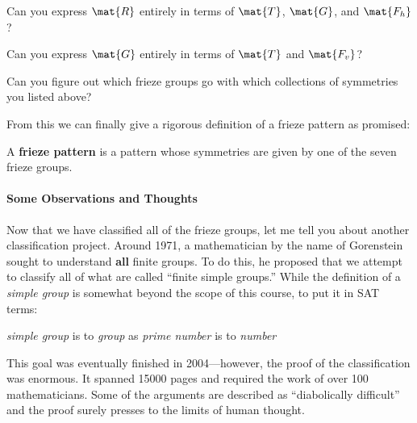 \begin{ques} 
Can you express $\mat{R}$ entirely in terms of $\mat{T}$, $\mat{G}$,
and $\mat{F_h}$?
\end{ques}
\QM

\begin{ques} 
Can you express $\mat{G}$ entirely in terms of $\mat{T}$ and $\mat{F_v}$?
\end{ques}
\QM


\begin{ques} 
Can you figure out which frieze groups go with which collections of
symmetries you listed above?
\end{ques}
\QM


From this we can finally give a rigorous definition of a frieze pattern
as promised:

\begin{dfn}
A \textbf{frieze pattern} is a pattern whose symmetries are given by
one of the seven frieze groups.
\end{dfn}




\paragraph{Some Observations and Thoughts}


Now that we have classified all of the frieze groups, let me tell you about
another classification project. Around 1971, a mathematician by the
name of Gorenstein sought to understand \textbf{all} finite
groups. To do this, he proposed that we attempt to classify all of
what are called ``finite simple groups.'' While the definition of a
\textit{simple group} is somewhat beyond the scope of this course, to
put it in SAT terms:
\begin{center}
\textit{simple group} is to \textit{group} \qquad as \qquad \textit{prime number} is to \textit{number}
\end{center}
This goal was eventually finished in 2004---however, the proof of the
classification was enormous. It spanned 15000 pages and required the
work of over 100 mathematicians. Some of the arguments are described
as ``diabolically difficult'' and the proof surely presses to the
limits of human thought.







\newpage

